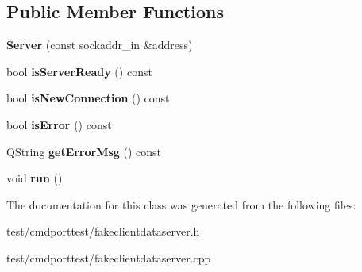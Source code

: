 \subsection*{Public Member Functions}
\begin{DoxyCompactItemize}
\item 
\mbox{\label{classServer_a6ecea21f2d902db623a16bdc10b2d596}} 
{\bfseries Server} (const sockaddr\+\_\+in \&address)
\item 
\mbox{\label{classServer_aa34777d0c2e485d8438882eea28a0e7f}} 
bool {\bfseries is\+Server\+Ready} () const
\item 
\mbox{\label{classServer_a17e79b26af087164d6d5ac76438859e8}} 
bool {\bfseries is\+New\+Connection} () const
\item 
\mbox{\label{classServer_aa43d763f786d9b4b9965b2ee5b7915b1}} 
bool {\bfseries is\+Error} () const
\item 
\mbox{\label{classServer_ab58bb651f65f7aae5698292156a6cccd}} 
Q\+String {\bfseries get\+Error\+Msg} () const
\item 
\mbox{\label{classServer_abb27d30b40a94326e3fd629d3b30b7d5}} 
void {\bfseries run} ()
\end{DoxyCompactItemize}


The documentation for this class was generated from the following files\+:\begin{DoxyCompactItemize}
\item 
test/cmdporttest/fakeclientdataserver.\+h\item 
test/cmdporttest/fakeclientdataserver.\+cpp\end{DoxyCompactItemize}
